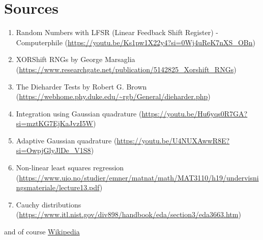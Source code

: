 \documentclass[titlepage, 11pt]{article}
\begin{document}
\pagebreak

\section{Sources}
\begin{enumerate}
    \item Random Numbers with LFSR (Linear Feedback Shift Register) - Computerphile (\url{https://youtu.be/Ks1pw1X22y4?si=0Wj4uReK7nXS\_OBn})
    \item XORShift RNGs by George Marsaglia (\url{https://www.researchgate.net/publication/5142825_Xorshift_RNGs})
    \item The Dieharder Tests by Robert G. Brown (\url{https://webhome.phy.duke.edu/~rgb/General/dieharder.php})
    \item Integration using Gaussian quadrature\newline
    (\url{https://youtu.be/Hu6yqs0R7GA?si=mztKG7EjKaJvzI5W})
    \item Adaptive Gaussian quadrature 
    (\url{https://youtu.be/U4NUXAwwR8E?si=OwpjGlyJlDe_V1S8})
    \item Non-linear least squares regression (\url{https://www.uio.no/studier/emner/matnat/math/MAT3110/h19/undervisningsmateriale/lecture13.pdf})
    \item Cauchy distributions
    (\url{https://www.itl.nist.gov/div898/handbook/eda/section3/eda3663.htm})
\end{enumerate}
and of course \href{https://www.wikipedia.org/}{Wikipedia}
\end{document}
